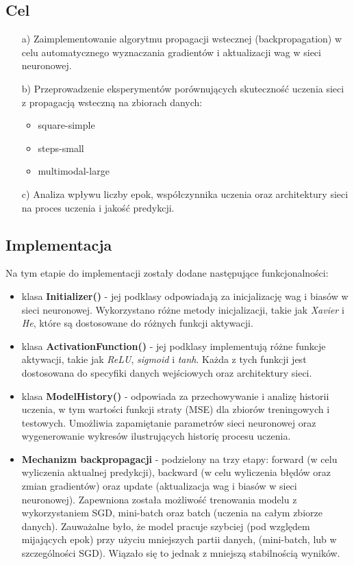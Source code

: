 \documentclass{article}
\begin{document}
\subsection*{Cel}
\begin{enumerate}
    \item[a)] Zaimplementowanie algorytmu propagacji wstecznej (backpropagation) w celu automatycznego wyznaczania gradientów i aktualizacji wag w sieci neuronowej.
    \item[b)] Przeprowadzenie eksperymentów porównujących skuteczność uczenia sieci z propagacją wsteczną na zbiorach danych:
    \begin{itemize}
        \item square-simple
        \item steps-small
        \item multimodal-large
    \end{itemize}
    \item[c)] Analiza wpływu liczby epok, współczynnika uczenia oraz architektury sieci na proces uczenia i jakość predykcji.
\end{enumerate}

\subsection*{Implementacja}
Na tym etapie do implementacji zostały dodane następujące funkcjonalności:
\begin{itemize}
    \item klasa \textbf{Initializer()} - jej podklasy odpowiadają za inicjalizację wag i biasów w sieci neuronowej. Wykorzystano różne metody inicjalizacji, takie jak \textit{Xavier} i \textit{He}, które są dostosowane do różnych funkcji aktywacji.
    \item klasa \textbf{ActivationFunction()} - jej podklasy implementują różne funkcje aktywacji, takie jak \textit{ReLU}, \textit{sigmoid} i \textit{tanh}. Każda z tych funkcji jest dostosowana do specyfiki danych wejściowych oraz architektury sieci.
    \item klasa \textbf{ModelHistory()} - odpowiada za przechowywanie i analizę historii uczenia, w tym wartości funkcji straty (MSE) dla zbiorów treningowych i testowych. Umożliwia zapamiętanie parametrów sieci neuronowej oraz wygenerowanie wykresów ilustrujących historię procesu uczenia.
    \item \textbf{Mechanizm backpropagacji} - podzielony na trzy etapy: forward (w celu wyliczenia aktualnej predykcji), backward (w celu wyliczenia błędów oraz zmian gradientów) oraz update (aktualizacja wag i biasów w sieci neuronowej). Zapewniona została możliwość trenowania modelu z wykorzystaniem SGD, mini-batch oraz batch (uczenia na całym zbiorze danych). Zauważalne było, że model pracuje szybciej (pod względem mijających epok) przy użyciu mniejszych partii danych, (mini-batch, lub w szczególności SGD). Wiązało się to jednak z mniejszą stabilnością wyników.
\end{itemize}
\end{document}
